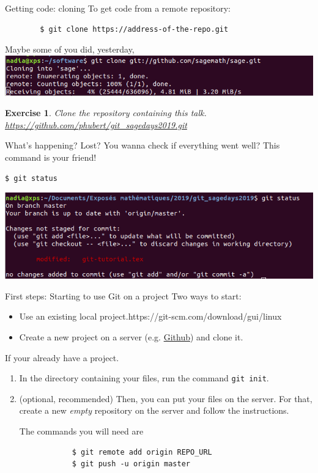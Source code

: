 \documentclass{beamer}
\newtheorem{exo}{Exercise}
\begin{document}
	\begin{frame}[fragile]{Getting code: cloning}
		To get code from a remote repository:
		\begin{verbatim}
		$ git clone https://address-of-the-repo.git
		\end{verbatim}
		Maybe some of you did, yesterday,
		\includegraphics[width=\linewidth]{clone}
		\pause
		\begin{exo}
			Clone the repository containing this talk.
			\url{https://github.com/phubert/git_sagedays2019.git}
		\end{exo}
	\end{frame}

	\begin{frame}[fragile]{What's happening?}
		Lost? You wanna check if everything went well? This command is your friend!
		\begin{verbatim}
$ git status
		\end{verbatim}
		\begin{center}
			\includegraphics[width=\linewidth]{status}
		\end{center}
	\end{frame}

	\begin{frame}[fragile]{First steps: Starting to use Git on a project}
		Two ways to start: 
		\begin{itemize}
			\item Use an existing local project.https://git-scm.com/download/gui/linux
			\item Create a new project on a server (e.g. \href{https://github.com/}{Github}) and clone it. \newline
		\end{itemize}
	
		If your already have a project.
		\begin{enumerate}
		\item  In the directory containing your files, run the command 
		\mbox{\texttt{git init}}.
		
		\item  (optional, recommended) Then, you can put your files on the server. For that, create a new \emph{empty} repository on the server and follow the instructions.
		
		The commands you will need are 
		\begin{verbatim}
			$ git remote add origin REPO_URL
			$ git push -u origin master
		\end{verbatim}
		
		\end{enumerate}   
	\end{frame}
\end{document}
